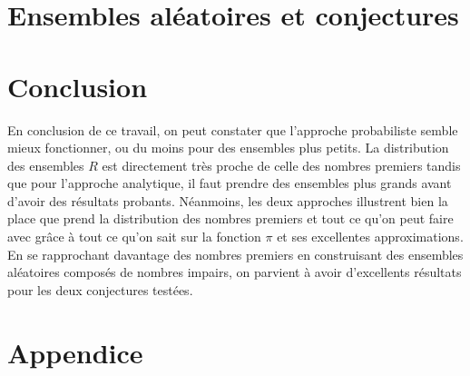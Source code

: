 \documentclass{article}
\begin{document}
\section{Ensembles aléatoires et conjectures}
    
		
		
		
\section{Conclusion}
En conclusion de ce travail, on peut constater que l'approche probabiliste semble mieux fonctionner, ou du moins pour des ensembles plus petits. La distribution des ensembles $R$ est directement très proche de celle des nombres premiers tandis que pour l'approche analytique, il faut prendre des ensembles plus grands avant d'avoir des résultats probants. Néanmoins, les deux approches illustrent bien la place que prend la distribution des nombres premiers et tout ce qu'on peut faire avec grâce à tout ce qu'on sait sur la fonction $\pi$ et ses excellentes approximations. En se rapprochant davantage des nombres premiers en construisant des ensembles aléatoires composés de nombres impairs, on parvient à avoir d'excellents résultats pour les deux conjectures testées. 
\newpage




\clearpage
\appendix
	\section{Appendice}
		
		
\newpage
\printindex
\end{document}
